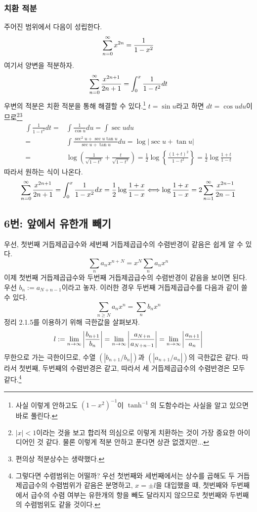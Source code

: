 \subsubsection{치환 적분}
주어진 범위에서 다음이 성립한다.
\[
\sum^\infty_{n=0}x^{2n}=\frac{1}{1-x^2}
\]
여기서 양변을 적분하자.
\[
\sum^\infty_{n=0}\frac{x^{2n+1}}{2n+1}=\int^x_0 \frac{1}{1-t^2}dt
\]
우변의 적분은 치환 적분을 통해 해결할 수 있다.\footnote{사실 이렇게 안하고도 $(1-x^2)^{-1}$이 $\tanh^{-1}$의 도함수라는 사실을 알고 있으면 바로 풀린다.} $t=\sin u$라고 하면 $dt=\cos udu$이므로\footnote{$|x|<1$이라는 것을 보고 합리적 의심으로 이렇게 치환하는 것이 가장 중요한 아이디어인 것 같다. 물론 이렇게 적분 안하고 푼다면 상관 없겠지만...}\footnote{편의상 적분상수는 생략했다.}
\begin{align*}
\int \frac{1}{1-t^2}dt=&\int\frac{1}{\cos u}du=\int \sec udu\\
=&\int \frac{\sec^2 u+\sec u\tan u}{\sec u+\tan u}du=\log\left|\sec u+\tan u\right|\\
=&\log\left(\frac{1}{\sqrt{1-t^2}}+\frac{t}{\sqrt{1-t^2}}\right)=\frac{1}{2}\log\left\{\frac{(1+t)^2}{1-t^2}\right\}=\frac{1}{2}\log\frac{1+t}{1-t}
\end{align*}
따라서 원하는 식이 나온다.
\[
\sum^\infty_{n=0}\frac{x^{2n+1}}{2n+1}=\int^x_0 \frac{1}{1-x^2}dx=\frac{1}{2}\log\frac{1+x}{1-x}\Longleftrightarrow\log\frac{1+x}{1-x}=2\sum^\infty_{n=1}\frac{x^{2n-1}}{2n-1}
\]

\subsection{6번: 앞에서 유한개 빼기}
우선, 첫번째 거듭제곱급수와 세번째 거듭제곱급수의 수렴반경이 같음은 쉽게 알 수 있다.
\[
\sum_n a_nx^{n+N}=x^N\sum_n a_nx^n
\]
이제 첫번째 거듭제곱급수와 두번째 거듭제곱급수의 수렴반경이 같음을 보이면 된다. 우선 $b_n:=a_{N+n-1}$이라고 놓자. 이러한 경우 두번째 거듭제곱급수를 다음과 같이 쓸 수 있다.
\[
\sum_{n\geq N}a_nx^n=\sum_n b_nx^n
\]
정리 2.1.5를 이용하기 위해 극한값을 살펴보자.
\[
l:=\lim_{n\to\infty}\left|\frac{b_{n+1}}{b_n}\right|=\lim_{n\to\infty}\left|\frac{a_{N+n}}{a_{N+n-1}}\right|=\lim_{n\to\infty}\left|\frac{a_{n+1}}{a_n}\right|
\]
무한으로 가는 극한이므로, 수열 $(|b_{n+1}/b_n|)$과 $(|a_{n+1}/a_n|)$의 극한값은 같다. 따라서 첫번째, 두번째의 수렴반경은 같고, 따라서 세 거듭제곱급수의 수렴반경은 모두 같다.\footnote{그렇다면 수렴범위는 어떨까? 우선 첫번째와 세번째에서는 상수를 곱해도 두 거듭제곱급수의 수렴범위가 같음은 분명하고, $x=\pm l$을 대입했을 때, 첫번째와 두번째에서 급수의 수렴 여부는 유한개의 항을 빼도 달라지지 않으므로 첫번째와 두번째의 수렴범위도 같을 것이다.} 
